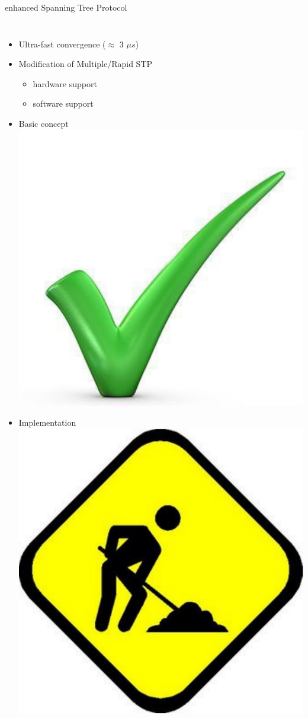 \documentclass[compress,red]{beamer}
\begin{document}
\begin{frame}{enhanced Spanning Tree Protocol}

\begin{columns}[c]

  \begin{itemize}
    \item Ultra-fast convergence ($\approx$ 3 $\mu s$)
    \item Modification of Multiple/Rapid STP 
    \begin{itemize}
      \item hardware support
      \item software support
     \end{itemize}
    \item Basic concept  \includegraphics[width=.5cm]{misc/big-tick.pdf}
    \item Implementation \includegraphics[width=.5cm]{misc/underconstruction.pdf}
  \end{itemize}



\end{columns}
\end{frame}
\end{document}
